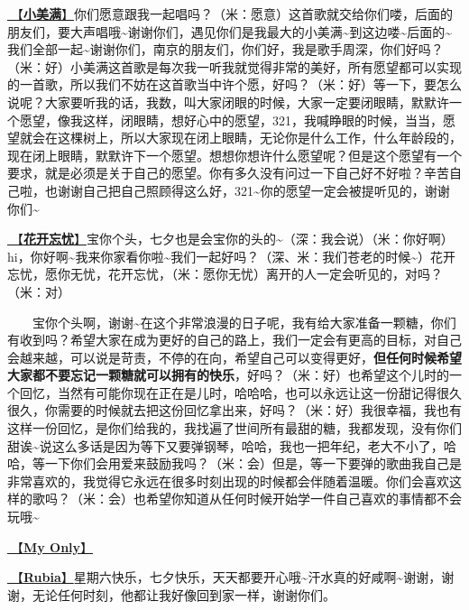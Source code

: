 \documentclass[]{ctexbook}
\begin{document}
\hyperref[happy-ending]{🎵【\textbf{小美满}】}你们愿意跟我一起唱吗？（米：愿意）这首歌就交给你们喽，后面的朋友们，要大声唱哦\textasciitilde 谢谢你们，遇见你们是我最大的小美满\textasciitilde 到这边喽\textasciitilde 后面的\textasciitilde 我们全部一起\textasciitilde 谢谢你们，南京的朋友们，你们好，我是歌手周深，你们好吗？（米：好）小美满这首歌是每次我一听我就觉得非常的美好，所有愿望都可以实现的一首歌，所以我们不妨在这首歌当中许个愿，好吗？（米：好）等一下，要怎么说呢？大家要听我的话，我数，叫大家闭眼的时候，大家一定要闭眼睛，默默许一个愿望，像我这样，闭眼睛，想好心中的愿望，321，我喊睁眼的时候，当当，愿望就会在这棵树上，所以大家现在闭上眼睛，无论你是什么工作，什么年龄段的，现在闭上眼睛，默默许下一个愿望。想想你想许什么愿望呢？但是这个愿望有一个要求，就是必须是关于自己的愿望。你有多久没有问过一下自己好不好啦？辛苦自己啦，也谢谢自己把自己照顾得这么好，321\textasciitilde 你的愿望一定会被提听见的，谢谢你们\textasciitilde{}

\hyperref[no-worries]{🎵【\textbf{花开忘忧}】}宝你个头，七夕也是会宝你的头的\textasciitilde（深：我会说）（米：你好啊）hi，你好啊\textasciitilde 我来你家看你啦\textasciitilde 我们一起好吗？（深、米：我们苍老的时候\textasciitilde）花开忘忧，愿你无忧，花开忘忧，（米：愿你无忧）离开的人一定会听见的，对吗？（米：对）

  宝你个头啊，谢谢\textasciitilde 在这个非常浪漫的日子呢，我有给大家准备一颗糖，你们有收到吗？希望大家在成为更好的自己的路上，我们一定会有更高的目标，对自己会越来越，可以说是苛责，不停的在向，希望自己可以变得更好，\textbf{但任何时候希望大家都不要忘记一颗糖就可以拥有的快乐}，好吗？（米：好）也希望这个儿时的一个回忆，当然有可能你现在正在是儿时，哈哈哈，也可以永远让这一份甜记得很久很久，你需要的时候就去把这份回忆拿出来，好吗？（米：好）我很幸福，我也有这样一份回忆，是你们给我的，我找遍了世间所有最甜的糖，我都发现，没有你们甜诶\textasciitilde 说这么多话是因为等下又要弹钢琴，哈哈，我也一把年纪，老大不小了，哈哈，等一下你们会用爱来鼓励我吗？（米：会）但是，等一下要弹的歌曲我自己是非常喜欢的，我觉得它永远在很多时刻出现的时候都会伴随着温暖。你们会喜欢这样的歌吗？（米：会）也希望你知道从任何时候开始学一件自己喜欢的事情都不会玩哦\textasciitilde{}

\hyperref[my-only]{🎵【\textbf{My Only}】}

\hyperref[rubia]{🎵【\textbf{Rubia}】}星期六快乐，七夕快乐，天天都要开心哦\textasciitilde 汗水真的好咸啊\textasciitilde 谢谢，谢谢，无论任何时刻，他都让我好像回到家一样，谢谢你们。
\end{document}
